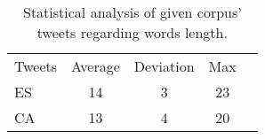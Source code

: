 \begin{table}[h]
	\centering
	\caption{Statistical analysis of given corpus' tweets regarding words length.}
	\label{tab:tweet}
	\begin{tabular}{l|cccc}
		\hline\noalign{\smallskip}
		Tweets		& Average		& Deviation		& Max		\\
		\noalign{\smallskip}
		\hline
		\noalign{\smallskip}
		ES			& 14			& 3				& 23		\\ 
		CA			& 13			& 4				& 20		\\ 
		\hline
	\end{tabular}
\end{table}

